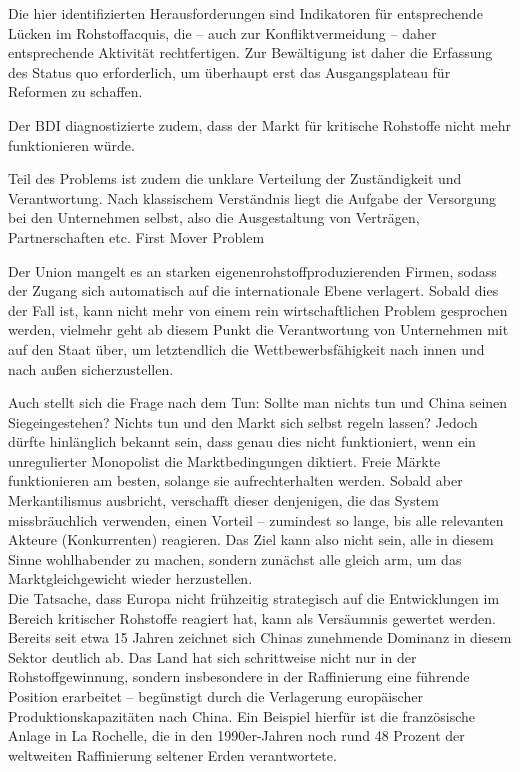 \documentclass[12pt,a4paper,oneside]{book} %
\begin{document}
Die hier identifizierten Herausforderungen sind Indikatoren für entsprechende Lücken im Rohstoffacquis, die -- auch zur Konfliktvermeidung -- daher entsprechende Aktivität rechtfertigen. Zur Bewältigung ist daher die Erfassung des Status quo erforderlich, um überhaupt erst das Ausgangsplateau für Reformen zu schaffen.

Der BDI diagnostizierte zudem, dass der Markt für kritische Rohstoffe nicht mehr funktionieren würde.

Teil des Problems ist zudem die unklare Verteilung der Zuständigkeit und Verantwortung. Nach klassischem Verständnis liegt die Aufgabe der Versorgung bei den Unternehmen selbst, also die Ausgestaltung von Verträgen, Partnerschaften etc. 
First Mover Problem

Der Union mangelt es an starken \glqq eigenen\grqq rohstoffproduzierenden Firmen, sodass der Zugang sich automatisch auf die internationale Ebene verlagert. Sobald dies der Fall ist, kann nicht mehr von einem rein wirtschaftlichen Problem gesprochen werden, vielmehr geht ab diesem Punkt die Verantwortung von Unternehmen mit auf den Staat über, um letztendlich die Wettbewerbsfähigkeit nach innen und nach außen sicherzustellen.

Auch stellt sich die Frage nach dem Tun: Sollte man nichts tun und China seinen \glqq Sieg\grqq eingestehen? Nichts tun und den Markt sich selbst regeln lassen? Jedoch dürfte hinlänglich bekannt sein, dass genau dies nicht funktioniert, wenn ein unregulierter Monopolist die Marktbedingungen diktiert. Freie Märkte funktionieren am besten, solange sie aufrechterhalten werden. Sobald aber Merkantilismus ausbricht, verschafft dieser denjenigen, die das System missbräuchlich verwenden, einen Vorteil -- zumindest so lange, bis alle relevanten Akteure (Konkurrenten) reagieren. Das Ziel kann also nicht sein, alle in diesem Sinne wohlhabender zu machen, sondern zunächst alle \glqq gleich arm\grqq, um das Marktgleichgewicht wieder herzustellen.
\\
Die Tatsache, dass Europa nicht frühzeitig strategisch auf die Entwicklungen im Bereich kritischer Rohstoffe reagiert hat, kann als Versäumnis gewertet werden. Bereits seit etwa 15 Jahren zeichnet sich Chinas zunehmende Dominanz in diesem Sektor deutlich ab. Das Land hat sich schrittweise nicht nur in der Rohstoffgewinnung, sondern insbesondere in der Raffinierung eine führende Position erarbeitet – begünstigt durch die Verlagerung europäischer Produktionskapazitäten nach China. Ein Beispiel hierfür ist die französische Anlage in La Rochelle, die in den 1990er-Jahren noch rund 48 Prozent der weltweiten Raffinierung seltener Erden verantwortete.
\end{document}

